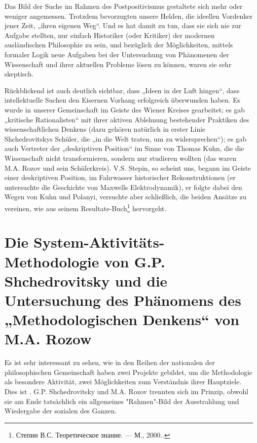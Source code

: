 \documentclass[11pt,a4paper]{article}
\begin{document}
Das Bild der Suche im Rahmen des Postpositivismus gestaltete sich mehr oder
weniger angemessen.  Trotzdem bevorzugten unsere Helden, die ideellen
Vordenker jener Zeit, „ihren eigenen Weg“. Und es hat damit zu tun, dass sie
sich nie zur Aufgabe stellten, nur einfach Historiker (oder Kritiker) der
modernen ausländischen Philosophie zu sein, und bezüglich der Möglichkeiten,
mittels formaler Logik neue Aufgaben bei der Untersuchung von Phänomenen der
Wissenschaft und ihrer aktuellen Probleme lösen zu können, waren sie sehr
skeptisch.

Rückblickend ist auch deutlich sichtbar, dass „Ideen in der Luft hingen“, dass
intellektuelle Suchen den Eisernen Vorhang erfolgreich überwunden haben. Es
wurde in unserer Gemeinschaft im Geiste des Wiener Kreises gearbeitet; es gab
„kritische Rationalisten“ mit ihrer aktiven Ablehnung bestehender Praktiken
des wissenschaftlichen Denkens (dazu gehören natürlich in erster Linie
Shchedrovitskys Schüler, die „in die Welt traten, um zu widersprechen“); es
gab auch Vertreter der „deskriptiven Position“ im Sinne von Thomas Kuhn, die
die Wissenschaft nicht transformieren, sondern nur studieren wollten (das
waren M.A. Rozov und sein Schülerkreis). V.S. Stepin, so scheint uns, begann
im Geiste einer deskriptiven Position, im Fahrwasser historischer
Rekonstruktionen (er untersuchte die Geschichte von Maxwells Elektrodynamik),
er folgte dabei den Wegen von Kuhn und Polanyi, versuchte aber schließlich,
die beiden Ansätze zu vereinen, wie aus seinem
Resultate-Buch\footnote{\foreignlanguage{russian}{Степин В.С. Теоретическое
    знание. — М., 2000.}.} hervorgeht.

\section{Die System-Aktivitäts-Methodologie von G.P. Shchedrovitsky und die
  Untersuchung des Phänomens des „Methodologischen Denkens“ von M.A. Rozow}

Es ist sehr interessant zu sehen, wie in den Reihen der nationalen der
philosophischen Gemeinschaft haben zwei Projekte gebildet, um die Methodologie
als besondere Aktivität, zwei Möglichkeiten zum Verständnis ihrer
Hauptziele. Dies ist .  G.P. Shchedrovitsky und M.A. Rozov trennten sich im
Prinzip, obwohl sie am Ende tatsächlich ein allgemeines "Rahmen"-Bild der
Ausstrahlung und Wiedergabe der sozialen des Ganzen.
\end{document}
